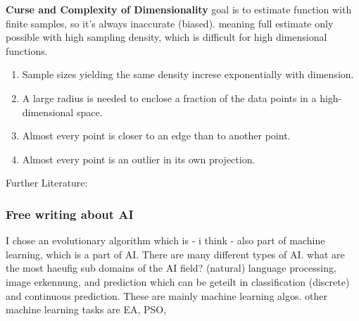 \textbf{Curse and Complexity of Dimensionality}
goal is to estimate function with finite samples, so it's always inaccurate (biased). 
meaning full estimate only possible with high sampling density, which is difficult for high dimensional functions.
\begin{enumerate}
	\item Sample sizes yielding the same density increse exponentially with dimension.
	\item A large radius is needed to enclose a fraction of the data points in a high-dimensional space.
	\item Almost every point is closer to an edge than to another point.
	\item Almost every point  is an outlier in its own projection.
\end{enumerate}



Further Literature: 

\subsubsection{Free writing about AI}
I chose an evolutionary algorithm which is - i think - also part of machine learning, 
which is a part of AI. 
There are many different types of AI. what are the most haeufig sub domains of the AI field? 
(natural) language processing, image erkennung, and prediction which can be geteilt in 
classification (discrete) and continuous prediction. 
These are mainly machine learning algos. other machine learning tasks are EA, PSO, 


